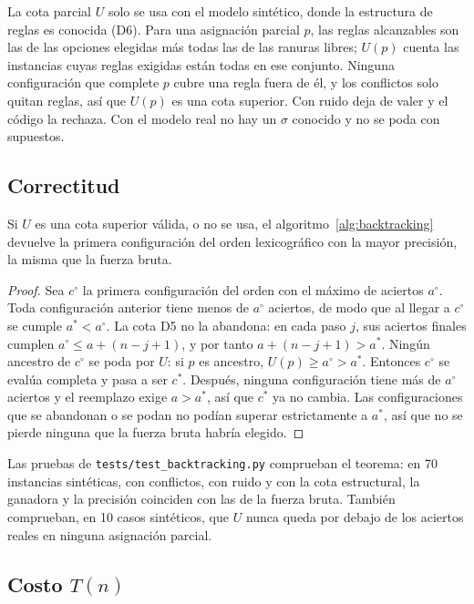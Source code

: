 La cota parcial $U$ solo se usa con el modelo sintético, donde la estructura de reglas es
conocida (D6). Para una asignación parcial $p$, las reglas alcanzables son las de las
opciones elegidas más todas las de las ranuras libres; $U(p)$ cuenta las instancias cuyas
reglas exigidas están todas en ese conjunto. Ninguna configuración que complete $p$ cubre una
regla fuera de él, y los conflictos solo quitan reglas, así que $U(p)$ es una cota superior.
Con ruido deja de valer y el código la rechaza. Con el modelo real no hay un $\sigma$ conocido
y no se poda con supuestos.

\subsection{Correctitud}

\begin{teorema}[Correctitud]\label{teo:exacto-correcto}
Si $U$ es una cota superior válida, o no se usa, el algoritmo~\ref{alg:backtracking}
devuelve la primera configuración del orden lexicográfico con la mayor precisión, la misma
que la fuerza bruta.
\end{teorema}
\begin{proof}
Sea $c^\circ$ la primera configuración del orden con el máximo de aciertos $a^\circ$. Toda
configuración anterior tiene menos de $a^\circ$ aciertos, de modo que al llegar a $c^\circ$
se cumple $a^*<a^\circ$. La cota D5 no la abandona: en cada paso $j$, sus aciertos finales
cumplen $a^\circ\le a+(n-j+1)$, y por tanto $a+(n-j+1)>a^*$. Ningún ancestro de $c^\circ$
se poda por $U$: si $p$ es ancestro, $U(p)\ge a^\circ>a^*$. Entonces $c^\circ$ se evalúa
completa y pasa a ser $c^*$. Después, ninguna configuración tiene más de $a^\circ$ aciertos y
el reemplazo exige $a>a^*$, así que $c^*$ ya no cambia. Las configuraciones que se
abandonan o se podan no podían superar estrictamente a $a^*$, así que no se pierde ninguna
que la fuerza bruta habría elegido.
\end{proof}

Las pruebas de \texttt{tests/test\_backtracking.py} comprueban el teorema: en 70 instancias
sintéticas, con conflictos, con ruido y con la cota estructural, la ganadora y la precisión
coinciden con las de la fuerza bruta. También comprueban, en 10 casos sintéticos, que $U$ nunca
queda por debajo de los aciertos reales en ninguna asignación parcial.

\subsection{Costo $T(n)$}

